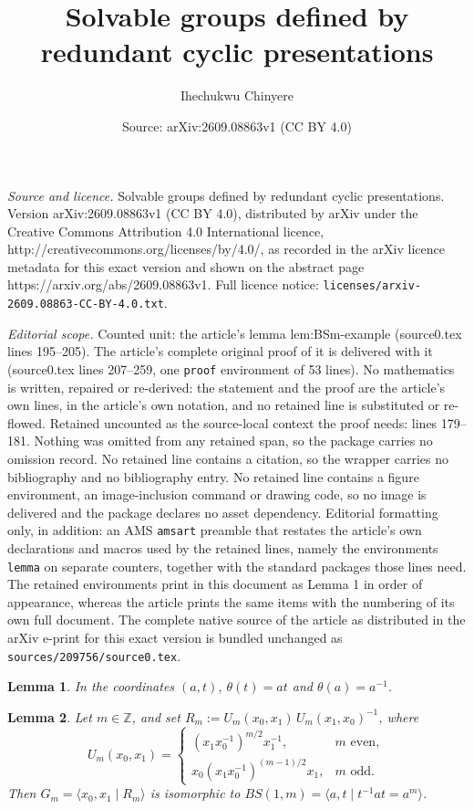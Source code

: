 \documentclass[10pt,a4paper]{amsart}
\title{Solvable groups defined by redundant cyclic presentations}
\author{Ihechukwu Chinyere}
\date{Source: arXiv:2609.08863v1 (CC BY 4.0)}
\newtheorem{lemma}{Lemma}
\begin{document}
\maketitle

\noindent\emph{Source and licence.} Solvable groups defined by redundant cyclic presentations. Version arXiv:2609.08863v1 (CC BY 4.0), distributed by arXiv under the Creative Commons Attribution 4.0 International licence, http://creativecommons.org/licenses/by/4.0/, as recorded in the arXiv licence metadata for this exact version and shown on the abstract page https://arxiv.org/abs/2609.08863v1. Full licence notice: \texttt{licenses/arxiv-2609.08863-CC-BY-4.0.txt}.\par\smallskip

\noindent\textit{Editorial scope.} Counted unit: the article's lemma lem:BSm-example (source0.tex lines 195--205). The article's complete original proof of it is delivered with it (source0.tex lines 207--259, one \texttt{proof} environment of 53 lines). No mathematics is written, repaired or re-derived: the statement and the proof are the article's own lines, in the article's own notation, and no retained line is substituted or re-flowed.  Retained uncounted as the source-local context the proof needs: lines 179--181.  Nothing was omitted from any retained span, so the package carries no omission record.  No retained line contains a citation, so the wrapper carries no bibliography and no bibliography entry.  No retained line contains a figure environment, an image-inclusion command or drawing code, so no image is delivered and the package declares no asset dependency.  Editorial formatting only, in addition: an AMS \texttt{amsart} preamble that restates the article's own declarations and macros used by the retained lines, namely the environments \texttt{lemma} on separate counters, together with the standard packages those lines need.  The retained environments print in this document as Lemma 1 in order of appearance, whereas the article prints the same items with the numbering of its own full document.  The complete native source of the article as distributed in the arXiv e-print for this exact version is bundled unchanged as \texttt{sources/209756/source0.tex}.
\begin{lemma}\label{lem:sigma-coords}
In the coordinates $(a,t)$, $\theta(t)=at$ and $\theta(a)=a^{-1}$.
\end{lemma}

\begin{lemma}\label{lem:BSm-example}
Let $m \in \mathbb{Z}$, and set $R_m := U_m(x_0,x_1)\,U_m(x_1,x_0)^{-1}$, where
\[
U_m(x_0,x_1) =
\begin{cases}
(x_1 x_0^{-1})^{m/2} x_1^{-1}, & m \text{ even}, \\[2pt]
x_0 (x_1 x_0^{-1})^{(m-1)/2} x_1, & m \text{ odd}.
\end{cases}
\]
Then $G_m =\langle x_0, x_1 \mid R_m \rangle$ is isomorphic to $BS(1,m) = \langle a, t \mid t^{-1} a t = a^m \rangle$.
\end{lemma}
\end{document}
